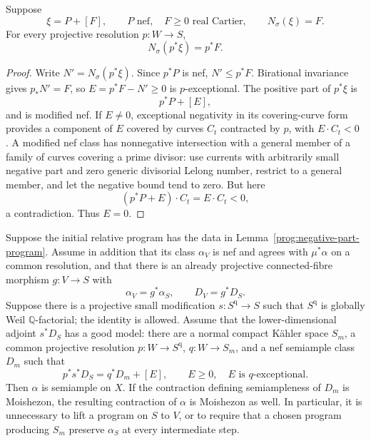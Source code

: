 \begin{lemma}
\label{prog:negative-part-pullback}
Suppose
\[
 \xi=P+[F],\qquad P\text{ nef},\quad F\geq0\text{ real Cartier},
 \qquad N_\sigma(\xi)=F.
\]
For every projective resolution $p:W\to S$,
\[
                         N_\sigma(p^*\xi)=p^*F.
\]
\end{lemma}

\begin{proof}
Write $N'=N_\sigma(p^*\xi)$. Since $p^*P$ is nef, $N'\leq p^*F$.
Birational invariance gives $p_*N'=F$, so
$E=p^*F-N'\geq0$ is $p$-exceptional. The positive part of $p^*\xi$ is
\[
                         p^*P+[E],
\]
and is modified nef. If $E\neq0$, exceptional negativity in its
covering-curve form provides a component of $E$ covered by curves $C_t$
contracted by $p$, with $E\cdot C_t<0$
\cite[Appendix~A, Lemma~A.3]{DHY}. A modified nef class has nonnegative
intersection with a general member of a family of curves covering a
prime divisor: use currents with arbitrarily small negative part and
zero generic divisorial Lelong number, restrict to a general member,
and let the negative bound tend to zero. But here
\[
                       (p^*P+E)\cdot C_t=E\cdot C_t<0,
\]
a contradiction. Thus $E=0$.
\end{proof}

\begin{proposition}
\label{prog:nef-good-comparison}
Suppose the initial relative program has the data in
Lemma~\ref{prog:negative-part-program}. Assume in addition that
its class $\alpha_V$ is nef and agrees with $\mu^*\alpha$ on a common
resolution, and that there is an already projective connected-fibre
morphism $g:V\to S$ with
\[
\alpha_V=g^*\alpha_S,\qquad D_V=g^*D_S.
\]
Suppose there is a projective small modification
$s:S^{\mathrm q}\to S$ such that $S^{\mathrm q}$ is globally Weil
$\mathbb Q$-factorial; the identity is allowed. Assume that the
lower-dimensional adjoint $s^*D_S$ has a good model:
there are a normal compact K\"ahler space $S_m$, a common projective
resolution $p:W\to S^{\mathrm q}$, $q:W\to S_m$, and a nef semiample
class $D_m$ such that
\[
                  p^*s^*D_S=q^*D_m+[E],
 \qquad E\geq0,\quad E\text{ is }q\text{-exceptional}.
\]
Then $\alpha$ is semiample on $X$. If the contraction defining
semiampleness of $D_m$ is Moishezon, the resulting contraction of
$\alpha$ is Moishezon as well. In particular, it is unnecessary to
lift a program on $S$ to $V$, or to require that a chosen program
producing $S_m$ preserve $\alpha_S$ at every intermediate step.
\end{proposition}

